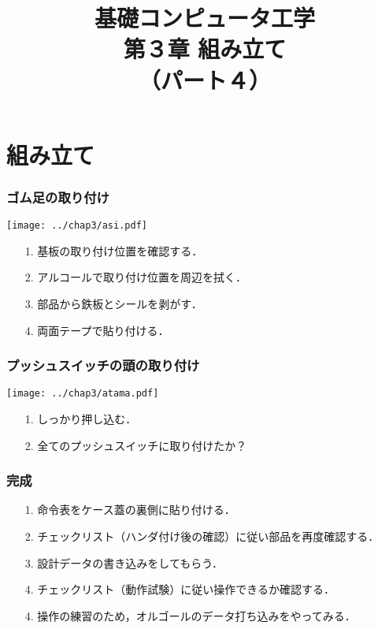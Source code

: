 \documentclass{beamer}                 %
\begin{document}
\title{基礎コンピュータ工学\\第３章 組み立て\\（パート４）}
\date{}

\begin{frame}
  \titlepage
\end{frame}


\section{組み立て}
\begin{frame}
  \frametitle{ゴム足の取り付け}
  \vfill
  \centerline{\texttt{[image: ../chap3/asi.pdf]}}
  \vfill
  \begin{enumerate}
    \item[1.] 基板の取り付け位置を確認する．
    \item[2.] アルコールで取り付け位置を周辺を拭く．
    \item[3.] 部品から鉄板とシールを剥がす．
    \item[4.] 両面テープで貼り付ける．
  \end{enumerate}
  \vfill
\end{frame}

\begin{frame}
  \frametitle{プッシュスイッチの頭の取り付け}
  \vfill
  \centerline{\texttt{[image: ../chap3/atama.pdf]}}
  \vfill
  \begin{enumerate}
    \item[1.] しっかり押し込む．
    \item[2.] 全てのプッシュスイッチに取り付けたか？
  \end{enumerate}
  \vfill
\end{frame}

\begin{frame}
  \frametitle{完成}
  \begin{enumerate}
    \item[1.] 命令表をケース蓋の裏側に貼り付ける．
    \item[2.] チェックリスト（ハンダ付け後の確認）に従い部品を再度確認する．
    \item[3.] 設計データの書き込みをしてもらう．
    \item[4.] チェックリスト（動作試験）に従い操作できるか確認する．
    \item[4.] 操作の練習のため，オルゴールのデータ打ち込みをやってみる．
  \end{enumerate}
  \vfill
\end{frame}

\end{document}
